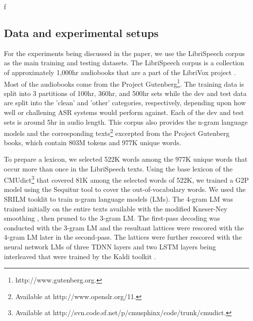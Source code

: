 f\documentclass{article}
\begin{document}
\subsection{Data and experimental setups}
For the experiments being discussed in the paper, we use the LibriSpeech corpus \cite{panayotov2015librispeech} as the main training and testing datasets. The LibriSpeech corpus is a collection of approximately 1,000hr audiobooks that are a part of the LibriVox project \cite{librivox14}. Most of the audiobooks come from the Project Gutenberg\footnote{http://www.gutenberg.org.}. The training data is split into 3 partitions of 100hr, 360hr, and 500hr sets while the dev and test data are split into the 'clean' and 'other' categories, respectively, depending upon how well or challening ASR systems would perform against. Each of the dev and test sets is around 5hr in audio length. This corpus also provides the n-gram language models and the corresponding texts\footnote{Available at http://www.openslr.org/11.} excerpted from the Project Gutenberg books, which contain 803M tokens and 977K unique words. 

To prepare a lexicon, we selected 522K words among the 977K unique words that occur more than once in the LibriSpeech texts. Using the base lexicon of the CMUdict\footnote{Available at http://svn.code.sf.net/p/cmusphinx/code/trunk/cmudict.} that covered 81K among the selected words of 522K, we trained a G2P model using the Sequitur tool \cite{sequitur} to cover the out-of-vocabulary words. We used the SRILM tooklit \cite{Stolcke02} to train n-gram language models (LMs). The 4-gram LM was  trained initially on the entire texts available with the modified Kneser-Ney smoothing \cite{kneserney,chen1996}, then pruned to the 3-gram LM. The first-pass decoding was conducted with the 3-gram LM and the resultant lattices were rescored with the 4-gram LM later in the second-pass. The lattices were further rescored \cite{Xu2018APR} with the neural network LMs of three TDNN layers and two LSTM layers being interleaved that were trained by the Kaldi toolkit \cite{Povey11}. 
\end{document}

